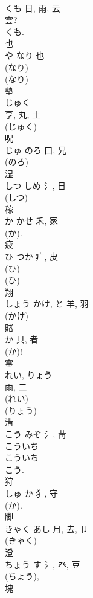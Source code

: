 \documentclass[8pt]{extreport}
\begin{document}
\begin{CJK}{UTF8}{min}
\\	くも	日, 雨, 云	
\\	雲? 
\\	くも.
\\	也	
\\	や	なり	也	
\\	(なり) 
\\	(なり) 
\\	塾	
\\	じゅく	
\\	享, 丸, 土	
\\	(じゅく) 
\\	呪	
\\	じゅ	のろ	口, 兄	
\\	(のろ) 
\\	湿	
\\	しつ	しめ	氵, 日		
\\	(しつ) 
\\	稼	
\\	か	かせ	禾, 家	
\\	(か). 
\\	疲	
\\	ひ	つか	疒, 皮	
\\	(ひ) 
\\	(ひ) 
\\	翔	
\\	しょう	かけ, と	羊, 羽	
\\	(かけ) 
\\	賭	
\\	か	貝, 者	
\\	(か)!	
\\	霊	
\\	れい, りょう	
\\	雨, 二		
\\	(れい) 
\\	(りょう) 
\\	溝	
\\	こう	みぞ	氵, 冓	
\\	こういち 
\\	こういち 
\\	こう.
\\	狩	
\\	しゅ	か	犭, 守	
\\	(か). 
\\	脚	
\\	きゃく	あし	月, 去, 卩	
\\	(きゃく) 
\\	澄	
\\	ちょう	す	氵, 癶, 豆	
\\	(ちょう), 
\\	塊	

\end{CJK}
\end{document}
